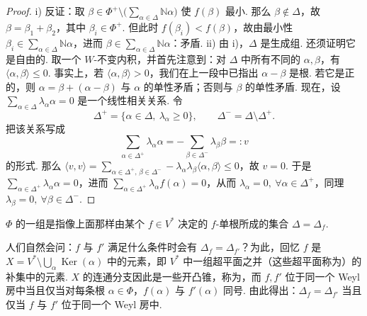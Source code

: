 \begin{proof}
i) 反证：取 $\beta\in\Phi^{+}\setminus\bigl(\sum_{\alpha\in\Delta}\mathbb{N}\alpha\bigr)$ 使 $f(\beta)$ 最小. 那么 $\beta\notin\Delta$，故 $\beta=\beta_1+\beta_2$，其中 $\beta_i\in\Phi^{+}$. 但此时 $f(\beta_i)<f(\beta)$，故由最小性 $\beta_i\in\sum_{\alpha\in\Delta}\mathbb{N}\alpha$，进而 $\beta\in\sum_{\alpha\in\Delta}\mathbb{N}\alpha$：矛盾.
ii) 由 i)，$\Delta$ 是生成组. 还须证明它是自由的. 取一个 $W$-不变内积，并首先注意到：对 $\Delta$ 中所有不同的 $\alpha,\beta$，有 $\langle\alpha,\beta\rangle\leqslant 0$. 事实上，若 $\langle\alpha,\beta\rangle>0$，我们在上一段中已指出 $\alpha-\beta$ 是根. 若它是正的，则 $\alpha=\beta+(\alpha-\beta)$ 与 $\alpha$ 的单性矛盾；否则与 $\beta$ 的单性矛盾.
现在，设 $\sum_{\alpha\in\Delta}\lambda_{\alpha}\alpha=0$ 是一个线性相关关系. 令
\[
\Delta^{+}=\{\alpha\in\Delta,\ \lambda_{\alpha}\geqslant 0\},
\qquad
\Delta^{-}=\Delta\setminus\Delta^{+}.
\]
把该关系写成
\[
\sum_{\alpha\in\Delta^{+}}\lambda_{\alpha}\alpha=-\sum_{\beta\in\Delta^{-}}\lambda_{\beta}\beta=:v
\]
的形式. 那么 $\langle v,v\rangle=\sum_{\alpha\in\Delta^{+},\,\beta\in\Delta^{-}}-\lambda_{\alpha}\lambda_{\beta}\langle\alpha,\beta\rangle\leqslant 0$，故 $v=0$. 于是 $\sum_{\alpha\in\Delta^{+}}\lambda_{\alpha}\alpha=0$，进而 $\sum_{\alpha\in\Delta^{+}}\lambda_{\alpha}f(\alpha)=0$，从而 $\lambda_{\alpha}=0,\ \forall\alpha\in\Delta^{+}$，同理 $\lambda_{\beta}=0,\ \forall\beta\in\Delta^{-}$.
\end{proof}
\begin{definition*}
$\Phi$ 的一组是指像上面那样由某个 $f\in V^{*}$ 决定的 $f$-单根所成的集合 $\Delta=\Delta_f$.
\end{definition*}
人们自然会问：$f$ 与 $f'$ 满足什么条件时会有 $\Delta_f=\Delta_{f'}$？为此，回忆 $f$ 是 $X=V^{*}\setminus\bigcup_{\alpha}\operatorname{Ker}(\alpha)$ 中的元素，即 $V^{*}$ 中一组超平面之并（这些超平面称为）的补集中的元素. $X$ 的连通分支因此是一些开凸锥，称为，而 $f,f'$ 位于同一个 Weyl 房中当且仅当对每条根 $\alpha\in\Phi$，$f(\alpha)$ 与 $f'(\alpha)$ 同号. 由此得出：$\Delta_f=\Delta_{f'}$ 当且仅当 $f$ 与 $f'$ 位于同一个 Weyl 房中.
